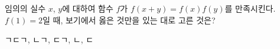 임의의 실수 $x$, $y$에 대하여 함수 $f$가 $f(x+y)=f(x)f(y)$를 만족시킨다. $f(1)=2$일 때, 보기에서 옳은 것만을 있는 대로 고른 것은? 
\begin{choices32}{ㄱ}{ㄷ}{ㄱ, ㄴ}{ㄱ, ㄷ}{ㄱ, ㄴ, ㄷ}\end{choices32}
